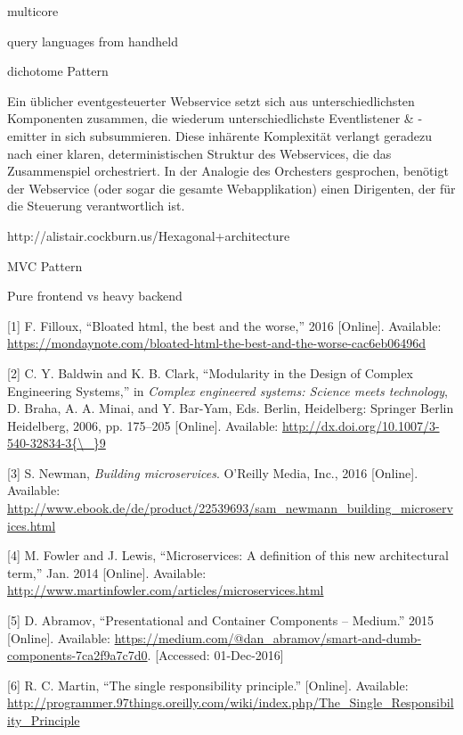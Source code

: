 \documentclass[]{assets/latex/ieee}
\begin{document}
multicore

query languages from handheld

dichotome Pattern

Ein üblicher eventgesteuerter Webservice setzt sich aus
unterschiedlichsten Komponenten zusammen, die wiederum
unterschiedlichste Eventlistener \& -emitter in sich subsummieren. Diese
inhärente Komplexität verlangt geradezu nach einer klaren,
deterministischen Struktur des Webservices, die das Zusammenspiel
orchestriert. In der Analogie des Orchesters gesprochen, benötigt der
Webservice (oder sogar die gesamte Webapplikation) einen Dirigenten, der
für die Steuerung verantwortlich ist.

http://alistair.cockburn.us/Hexagonal+architecture

MVC Pattern

Pure frontend vs heavy backend

\hypertarget{refs}{}
\hypertarget{ref-Filloux2016}{}
{[}1{]} F. Filloux, ``Bloated html, the best and the worse,'' 2016
{[}Online{]}. Available:
\url{https://mondaynote.com/bloated-html-the-best-and-the-worse-cac6eb06496d}

\hypertarget{ref-Baldwin2006}{}
{[}2{]} C. Y. Baldwin and K. B. Clark, ``Modularity in the Design of
Complex Engineering Systems,'' in \emph{Complex engineered systems:
Science meets technology}, D. Braha, A. A. Minai, and Y. Bar-Yam, Eds.
Berlin, Heidelberg: Springer Berlin Heidelberg, 2006, pp. 175--205
{[}Online{]}. Available:
\href{http://dx.doi.org/10.1007/3-540-32834-3\%7B/_\%7D9}{http://dx.doi.org/10.1007/3-540-32834-3\{\textbackslash{}\_\}9}

\hypertarget{ref-Newman2015}{}
{[}3{]} S. Newman, \emph{Building microservices}. O'Reilly Media, Inc.,
2016 {[}Online{]}. Available:
\url{http://www.ebook.de/de/product/22539693/sam_newmann_building_microservices.html}

\hypertarget{ref-Fowler2014}{}
{[}4{]} M. Fowler and J. Lewis, ``Microservices: A definition of this
new architectural term,'' Jan. 2014 {[}Online{]}. Available:
\url{http://www.martinfowler.com/articles/microservices.html}

\hypertarget{ref-Abramov2015}{}
{[}5{]} D. Abramov, ``Presentational and Container Components --
Medium.'' 2015 {[}Online{]}. Available:
\url{https://medium.com/@dan_abramov/smart-and-dumb-components-7ca2f9a7c7d0}.
{[}Accessed: 01-Dec-2016{]}

\hypertarget{ref-Martin}{}
{[}6{]} R. C. Martin, ``The single responsibility principle.''
{[}Online{]}. Available:
\url{http://programmer.97things.oreilly.com/wiki/index.php/The_Single_Responsibility_Principle}
\end{document}
